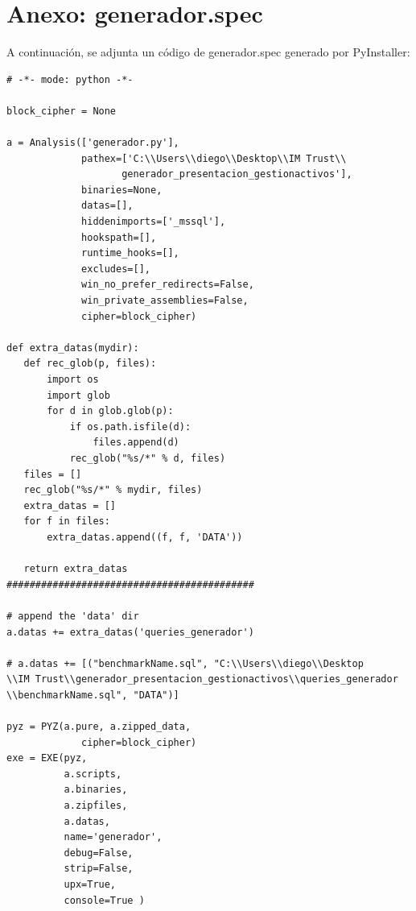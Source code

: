 \documentclass{article}
\begin{document}
\section{Anexo: generador.spec}
A continuación, se adjunta un código de generador.spec generado por PyInstaller:
\begin{lstlisting}
# -*- mode: python -*-

block_cipher = None

a = Analysis(['generador.py'],
             pathex=['C:\\Users\\diego\\Desktop\\IM Trust\\
             		generador_presentacion_gestionactivos'],
             binaries=None,
             datas=[],
             hiddenimports=['_mssql'],
             hookspath=[],
             runtime_hooks=[],
             excludes=[],
             win_no_prefer_redirects=False,
             win_private_assemblies=False,
             cipher=block_cipher)

def extra_datas(mydir):
   def rec_glob(p, files):
       import os
       import glob
       for d in glob.glob(p):
           if os.path.isfile(d):
               files.append(d)
           rec_glob("%s/*" % d, files)
   files = []
   rec_glob("%s/*" % mydir, files)
   extra_datas = []
   for f in files:
       extra_datas.append((f, f, 'DATA'))

   return extra_datas
###########################################

# append the 'data' dir
a.datas += extra_datas('queries_generador')

# a.datas += [("benchmarkName.sql", "C:\\Users\\diego\\Desktop
\\IM Trust\\generador_presentacion_gestionactivos\\queries_generador
\\benchmarkName.sql", "DATA")]

pyz = PYZ(a.pure, a.zipped_data,
             cipher=block_cipher)
exe = EXE(pyz,
          a.scripts,
          a.binaries,
          a.zipfiles,
          a.datas,
          name='generador',
          debug=False,
          strip=False,
          upx=True,
          console=True )

\end{lstlisting}
\end{document}
